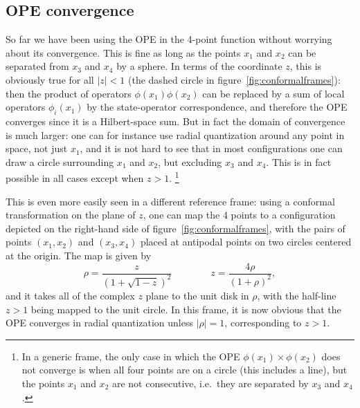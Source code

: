 \documentclass[a4paper,12pt]{article}
\numberwithin{equation}{section}
\begin{document}
\subsection{OPE convergence}

So far we have been using the OPE in the 4-point function without worrying about its convergence. This is fine as long as the points $x_1$ and $x_2$ can be separated from $x_3$ and $x_4$ by a sphere. 
In terms of the coordinate $z$, this is obviously true for all $\left| z \right| < 1$ (the dashed circle in figure~\ref{fig:conformalframes}): then the product of operators $\phi(x_1) \phi(x_2)$ can be replaced by a sum of local operators $\phi_i(x_1)$ by the state-operator correspondence, and therefore the OPE converges since it is a Hilbert-space sum. But in fact the domain of convergence is much larger: one can for instance use radial quantization around any point in space, not just $x_1$, and it is not hard to see that in most configurations one can draw a circle surrounding $x_1$ and $x_2$, but excluding $x_3$ and $x_4$. This is in fact possible in all cases except when $z > 1$.%
%
\footnote{In a generic frame, the only case in which the OPE $\phi(x_1) \times \phi(x_2)$ does not converge is when all four points are on a circle (this includes a line), but the points $x_1$ and $x_2$ are not consecutive, i.e.~they are separated by $x_3$ and $x_4$.}
%

This is even more easily seen in a different reference frame: using a conformal transformation on the plane of $z$, one can map the 4 points to a configuration depicted on the right-hand side of figure~\ref{fig:conformalframes}, with the pairs of points $(x_1, x_2) $ and  $(x_3, x_4)$ placed at antipodal points on two circles centered at the origin. The map is given by
\begin{equation}
	\rho = \frac{z}{\left( 1 + \sqrt{1-z} \right)^2}
	\qquad\qquad
	z = \frac{4\rho}{(1 + \rho)^2},
\end{equation}
and it takes all of the complex $z$ plane to the unit disk in $\rho$, with the half-line $z > 1$ being mapped to the unit circle. In this frame, it is now obvious that the OPE converges in radial quantization unless $\left| \rho \right| = 1$, corresponding to $z > 1$.
\end{document}
